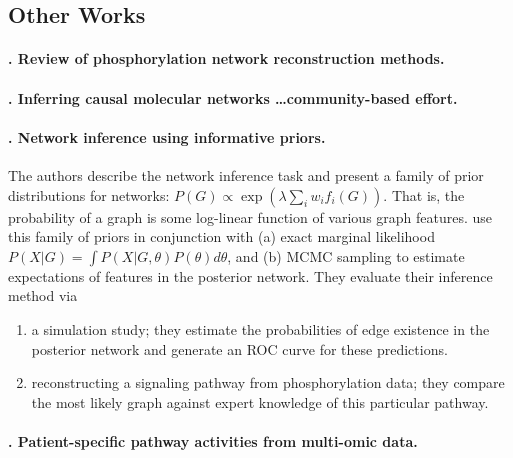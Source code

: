 \documentclass[14pt]{article}
\begin{document}
\subsection{Other Works}

\paragraph{ \citet{2018-invergo-review}. Review of phosphorylation network reconstruction methods. }

\paragraph{ \citet{2016-hill-community}. Inferring causal molecular networks \ldots community-based effort.}

\paragraph{ \citet{2008-mukherjee-priors}. Network inference using informative priors.}
The authors describe the network inference task and present a family of prior distributions for networks:
$ P(G) \propto \exp\left( \lambda \sum_i w_i f_i(G) \right).$ 
That is, the probability of a graph is some log-linear function of various graph features. 
\citeauthor{2008-mukherjee-priors} use this family of priors in conjunction with 
(a) exact marginal likelihood $P(X | G) = \int P(X | G, \theta) P(\theta) d\theta$, and
(b) MCMC sampling
to estimate expectations of features in the posterior network.
They evaluate their inference method via 
\begin{enumerate}
    \item a simulation study; they estimate the probabilities of edge existence in the posterior network
        and generate an ROC curve for these predictions.
    \item reconstructing a signaling pathway from phosphorylation data; they compare the most likely
        graph against expert knowledge of this particular pathway.
\end{enumerate}

\paragraph{ \citet{2010-vaske-paradigm}. Patient-specific pathway activities from multi-omic data.}




\pagebreak
\end{document}

